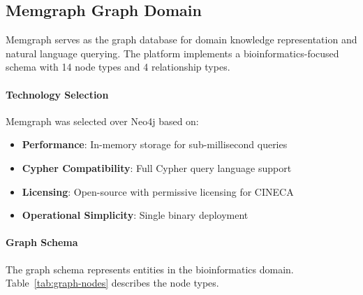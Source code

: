\subsection{Memgraph Graph Domain}
\label{subsec:memgraph}

Memgraph serves as the graph database for domain knowledge representation and natural language querying. The platform implements a bioinformatics-focused schema with 14 node types and 4 relationship types.

\paragraph{Technology Selection}
Memgraph was selected over Neo4j based on:
\begin{itemize}
    \item \textbf{Performance}: In-memory storage for sub-millisecond queries
    \item \textbf{Cypher Compatibility}: Full Cypher query language support
    \item \textbf{Licensing}: Open-source with permissive licensing for CINECA
    \item \textbf{Operational Simplicity}: Single binary deployment
\end{itemize}

\paragraph{Graph Schema}
The graph schema represents entities in the bioinformatics domain. Table~\ref{tab:graph-nodes} describes the node types.


